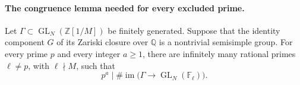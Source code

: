 
\paragraph{The congruence lemma needed for every excluded prime.}
Let \(\Gamma\subset\operatorname{GL}_N(\mathbb Z[1/M])\) be
finitely generated. Suppose that the identity component \(G\) of its
Zariski closure over \(\mathbb Q\) is a nontrivial semisimple group.
For every prime \(p\) and every integer \(a\geq1\), there are
infinitely many rational primes \(\ell\ne p\), with \(\ell\nmid M\),
such that
\[
       p^a\mid
       \#\operatorname{im}\bigl(\Gamma\longrightarrow
                    \operatorname{GL}_N(\mathbb F_\ell)\bigr).
                                                        \tag{AG.39.SA}
\]

